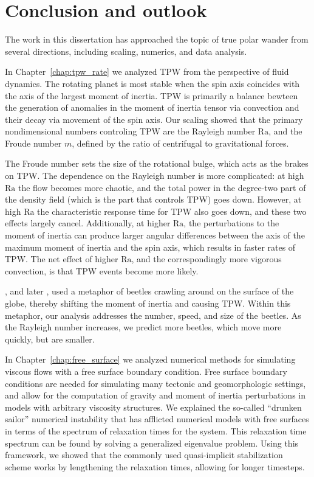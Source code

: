 \chapter{Conclusion and outlook}
\label{chap:conclusion}

The work in this dissertation has approached the topic of true polar wander
from several directions, including scaling, numerics, and data analysis.

In Chapter~\ref{chap:tpw_rate} we analyzed TPW from the perspective of fluid dynamics.
The rotating planet is most stable when the spin axis coincides with the axis of the largest moment of inertia.
TPW is primarily a balance bewteen the generation of anomalies in the moment of inertia tensor
via convection and their decay via movement of the spin axis.
Our scaling showed that the primary nondimensional numbers controling TPW are the Rayleigh number $\mathrm{Ra}$,
and the Froude number $m$, defined by the ratio of centrifugal to gravitational forces.

The Froude number sets the size of the rotational bulge, which acts
as the brakes on TPW. The dependence on the Rayleigh number is more complicated:
at high $\mathrm{Ra}$ the flow becomes more chaotic, and the total power in the degree-two
part of the density field (which is the part that controls TPW) goes down.
However, at high $\mathrm{Ra}$ the characteristic response time for TPW also goes down,
and these two effects largely cancel. Additionally, at higher $\mathrm{Ra}$,
the perturbations to the moment of inertia can produce larger angular differences
between the axis of the maximum moment of inertia and the spin axis,
which results in faster rates of TPW. The net effect of higher $\mathrm{Ra}$,
and the correspondingly more vigorous convection, is that TPW events become more likely.

\citet{gold1955instability}, and later \citet{goldreich1969some}, used a metaphor
of beetles crawling around on the surface of the globe, thereby shifting the moment
of inertia and causing TPW. Within this metaphor, our analysis addresses the
number, speed, and size of the beetles. As the Rayleigh number increases,
we predict more beetles, which move more quickly, but are smaller.

In Chapter~\ref{chap:free_surface} we analyzed numerical methods for simulating
viscous flows with a free surface boundary condition. Free surface boundary conditions
are needed for simulating many tectonic and geomorphologic settings, and
allow for the computation of gravity and moment of inertia perturbations 
in models with arbitrary viscosity structures. 
We explained the so-called ``drunken sailor'' numerical instability that
has afflicted numerical models with free surfaces in terms of the spectrum of relaxation
times for the system. This relaxation time spectrum can be found by solving a generalized eigenvalue problem.
Using this framework, we showed that the commonly used quasi-implicit stabilization
scheme works by lengthening the relaxation times, allowing for longer timesteps.

